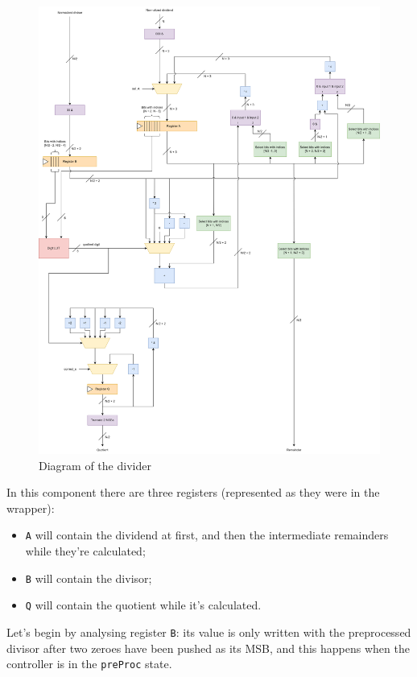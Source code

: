 \begin{figure}
    \centering
    \includegraphics[width=150mm]{images/SRTDivider.png}
    \caption{Diagram of the divider}
    \label{fig:divider_diagram}
\end{figure}

In this component there are three registers (represented as they were in the wrapper): 
\begin{itemize}
    \item \texttt{A} will contain the dividend at first, and then the intermediate remainders while they're calculated;
    \item  \texttt{B} will contain the divisor;  
    \item \texttt{Q} will contain the quotient while it's calculated.
\end{itemize}

Let's begin by analysing register \texttt{B}: its value is only written with the preprocessed divisor after two zeroes have been pushed as its MSB, and this happens when the controller is in the \texttt{preProc} state.

